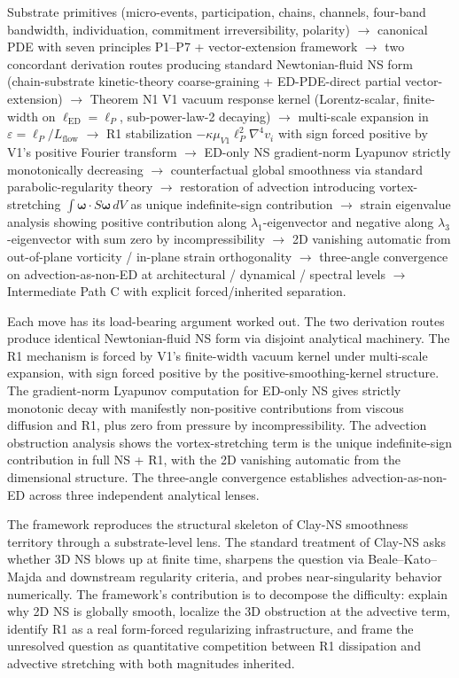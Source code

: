 \documentclass[11pt,a4paper]{article}
\begin{document}
Substrate primitives (micro-events, participation, chains, channels, four-band bandwidth, individuation, commitment irreversibility, polarity) $\to$ canonical PDE with seven principles P1--P7 + vector-extension framework $\to$ two concordant derivation routes producing standard Newtonian-fluid NS form (chain-substrate kinetic-theory coarse-graining + ED-PDE-direct partial vector-extension) $\to$ Theorem N1 V1 vacuum response kernel (Lorentz-scalar, finite-width on $\ell_{\mathrm{ED}} = \ell_P$, sub-power-law-2 decaying) $\to$ multi-scale expansion in $\varepsilon = \ell_P / L_{\mathrm{flow}}$ $\to$ R1 stabilization $-\kappa\mu_{V1}\ell_P^2\nabla^4 v_i$ with sign forced positive by V1's positive Fourier transform $\to$ ED-only NS gradient-norm Lyapunov strictly monotonically decreasing $\to$ counterfactual global smoothness via standard parabolic-regularity theory $\to$ restoration of advection introducing vortex-stretching $\int\boldsymbol{\omega}\cdot S\boldsymbol{\omega}\, dV$ as unique indefinite-sign contribution $\to$ strain eigenvalue analysis showing positive contribution along $\lambda_1$-eigenvector and negative along $\lambda_3$-eigenvector with sum zero by incompressibility $\to$ 2D vanishing automatic from out-of-plane vorticity / in-plane strain orthogonality $\to$ three-angle convergence on advection-as-non-ED at architectural / dynamical / spectral levels $\to$ Intermediate Path C with explicit forced/inherited separation.

Each move has its load-bearing argument worked out. The two derivation routes produce identical Newtonian-fluid NS form via disjoint analytical machinery. The R1 mechanism is forced by V1's finite-width vacuum kernel under multi-scale expansion, with sign forced positive by the positive-smoothing-kernel structure. The gradient-norm Lyapunov computation for ED-only NS gives strictly monotonic decay with manifestly non-positive contributions from viscous diffusion and R1, plus zero from pressure by incompressibility. The advection obstruction analysis shows the vortex-stretching term is the unique indefinite-sign contribution in full NS + R1, with the 2D vanishing automatic from the dimensional structure. The three-angle convergence establishes advection-as-non-ED across three independent analytical lenses.

The framework reproduces the structural skeleton of Clay-NS smoothness territory through a substrate-level lens. The standard treatment of Clay-NS asks whether 3D NS blows up at finite time, sharpens the question via Beale--Kato--Majda and downstream regularity criteria, and probes near-singularity behavior numerically. The framework's contribution is to decompose the difficulty: explain why 2D NS is globally smooth, localize the 3D obstruction at the advective term, identify R1 as a real form-forced regularizing infrastructure, and frame the unresolved question as quantitative competition between R1 dissipation and advective stretching with both magnitudes inherited.
\end{document}

